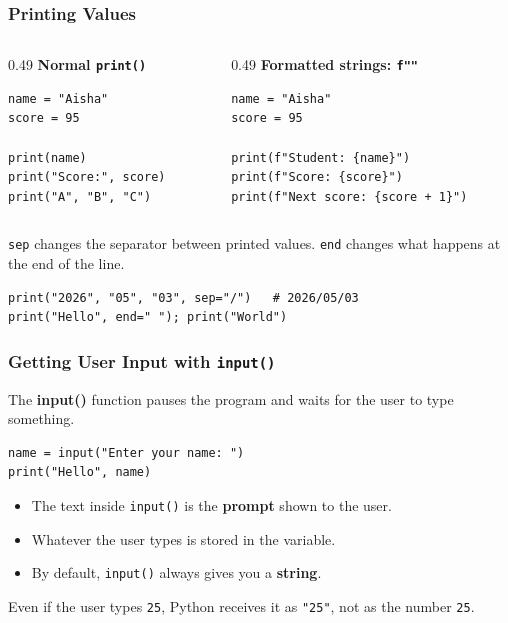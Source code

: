 \documentclass[aspectratio=169,10pt]{beamer}
\newcommand{\keyword}[1]{\textcolor{PrimaryBlue}{\textbf{#1}}}
\newcommand{\myitem}[1]{\item #1\vspace{0.04cm}}
\begin{document}
\begin{frame}[fragile]
\frametitle{Printing Values}
\vspace{0.05cm}
\begin{columns}[T,totalwidth=\textwidth]
\begin{column}{0.49\textwidth}
\textbf{Normal \texttt{print()}}
\begin{lstlisting}[style=pycode]
name = "Aisha"
score = 95

print(name)
print("Score:", score)
print("A", "B", "C")
\end{lstlisting}
\end{column}
\begin{column}{0.49\textwidth}
\textbf{Formatted strings: \texttt{f""}}
\begin{lstlisting}[style=pycode]
name = "Aisha"
score = 95

print(f"Student: {name}")
print(f"Score: {score}")
print(f"Next score: {score + 1}")
\end{lstlisting}
\end{column}
\end{columns}

\vspace{0.2cm}
\begin{tcolorbox}[lecturebox,title=Useful options]
\texttt{sep} changes the separator between printed values. \texttt{end} changes what happens at the end of the line.
\end{tcolorbox}
\begin{lstlisting}[style=pycode]
print("2026", "05", "03", sep="/")   # 2026/05/03
print("Hello", end=" "); print("World")
\end{lstlisting}
\end{frame}


\begin{frame}[fragile]
\frametitle{Getting User Input with \texttt{input()}}
\begin{tcolorbox}[lecturebox,title=Key idea]
The \keyword{input()} function pauses the program and waits for the user to type something.
\end{tcolorbox}

\begin{lstlisting}[style=pycode]
name = input("Enter your name: ")
print("Hello", name)
\end{lstlisting}

\begin{itemize}\setlength\itemsep{0.03cm}
  \myitem{The text inside \texttt{input()} is the \keyword{prompt} shown to the user.}
  \myitem{Whatever the user types is stored in the variable.}
  \myitem{By default, \texttt{input()} always gives you a \keyword{string}.}
\end{itemize}

\begin{tcolorbox}[lecturebox,title=Beginner checkpoint]
Even if the user types \texttt{25}, Python receives it as \texttt{"25"}, not as the number \texttt{25}.
\end{tcolorbox}
\end{frame}
\end{document}
